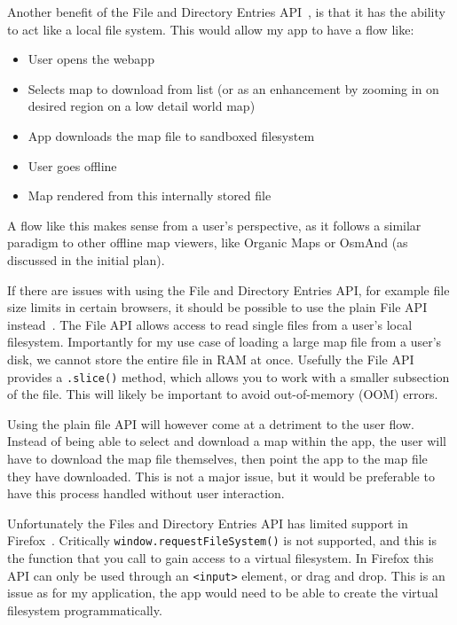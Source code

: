 \documentclass[a4paper,12pt]{article} %
\begin{document}
Another benefit of the File and Directory Entries API~\cite{w3c-file-directories-api}, is that it has the ability to act like a local file system. This would allow my app to have a flow like:

\begin{itemize}
    \item User opens the webapp
    \item Selects map to download from list (or as an enhancement by zooming in on desired region on a low detail world map)
    \item App downloads the map file to sandboxed filesystem
    \item User goes offline
    \item Map rendered from this internally stored file
\end{itemize}

A flow like this makes sense from a user's perspective, as it follows a similar paradigm to other offline map viewers, like Organic Maps or OsmAnd (as discussed in the initial plan).

If there are issues with using the File and Directory Entries API, for example file size limits in certain browsers, it should be possible to use the plain File API instead~\cite{w3c-file-api}. The File API allows access to read single files from a user's local filesystem. Importantly for my use case of loading a large map file from a user's disk, we cannot store the entire file in RAM at once. Usefully the File API provides a \texttt{.slice()} method, which allows you to work with a smaller subsection of the file. This will likely be important to avoid out-of-memory (OOM) errors.

Using the plain file API will however come at a detriment to the user flow. Instead of being able to select and download a map within the app, the user will have to download the map file themselves, then point the app to the map file they have downloaded. This is not a major issue, but it would be preferable to have this process handled without user interaction.

Unfortunately the Files and Directory Entries API has limited support in Firefox~\cite{mdn-file-directories-api-limitations}. Critically \texttt{window.requestFileSystem()} is not supported, and this is the function that you call to gain access to a virtual filesystem. In Firefox this API can only be used through an \texttt{<input>} element, or drag and drop. This is an issue as for my application, the app would need to be able to create the virtual filesystem programmatically.
\end{document}
